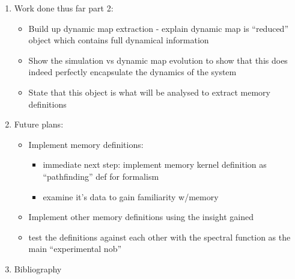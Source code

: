 \documentclass[
  letterpaper,
  DIV=11,
  numbers=noendperiod,
  oneside]{scrartcl}
\providecommand{\tightlist}{%
  \setlength{\itemsep}{0pt}\setlength{\parskip}{0pt}}
\begin{document}
\begin{enumerate}
  \begin{itemize}
  \tightlist
  \item
    Build up simulation utility - use this as opportunity to explain how
    the simulation is being propagated through time
  \item
    Show initial simulation test data here (gif of bath/system
    occupation evolution may help show what this evolution looks like)
  \item
    maybe run an additional sim where the system starts at
    thermalization - show plot w/occupation start 0, 1, n\_\{thermal\}
    all in one plot - use this to highlight the wierdness of quantum
    memory effects
  \end{itemize}
\item
  Work done thus far part 2:

  \begin{itemize}
  \tightlist
  \item
    Build up dynamic map extraction - explain dynamic map is ``reduced''
    object which contains full dynamical information
  \item
    Show the simulation vs dynamic map evolution to show that this does
    indeed perfectly encapsulate the dynamics of the system
  \item
    State that this object is what will be analysed to extract memory
    definitions
  \end{itemize}
\item
  Future plans:

  \begin{itemize}
  \tightlist
  \item
    Implement memory definitions:

    \begin{itemize}
    \tightlist
    \item
      immediate next step: implement memory kernel definition as
      ``pathfinding'' def for formalism
    \item
      examine it's data to gain familiarity w/memory
    \end{itemize}
  \item
    Implement other memory definitions using the insight gained
  \item
    test the definitions against each other with the spectral function
    as the main ``experimental nob''
  \end{itemize}
\item
  Bibliography
\end{enumerate}
\end{document}

